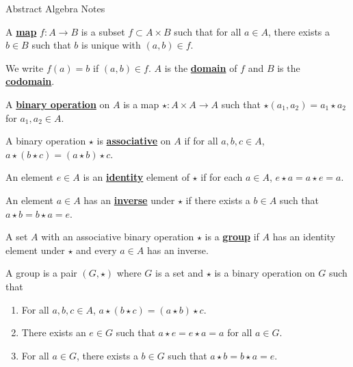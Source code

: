 \documentclass[11pt,letterpaper,boxed]{hmcpset}
\newcommand{\define}[1]{\underline{\textbf{#1}}}
\theoremstyle{definition}
\begin{document}
\begin{center}
    \LARGE{Abstract Algebra Notes}
\end{center}

\begin{defi}
    A \define{map} $f:A \rightarrow B$ is a subset $f\subset A\times B$ such that for all $a\in A$, there exists a $b\in B$ such that $b$ is unique with $(a,b)\in f$.
\end{defi}

\begin{defi}
    We write $f(a)=b$ if $(a,b)\in f$. $A$ is the \define{domain} of $f$ and $B$ is the \define{codomain}.
\end{defi}

\begin{defi}
    A \define{binary operation} on $A$ is a map $\star:A\times A\rightarrow A$ such that $\star(a_1,a_2)=a_1\star a_2$ for $a_1,a_2\in A$.
\end{defi}

\begin{defi}
    A binary operation $\star$ is \define{associative} on $A$ if for all $a,b,c\in A$, $a\star(b\star c)=(a\star b)\star c$.
\end{defi}

\begin{defi}
    An element $e\in A$ is an \define{identity} element of $\star$ if for each $a\in A$, $e\star a=a\star e=a$.
\end{defi}

\begin{defi}
    An element $a\in A$ has an \define{inverse} under $\star$ if there exists a $b\in A$ such that $a\star b=b\star a=e$.
\end{defi}

\begin{defi}
    A set $A$ with an associative binary operation $\star$ is a \define{group} if $A$ has an identity element under $\star$ and every $a\in A$ has an inverse.
\end{defi}

\begin{bdefi}
    A group is a pair $(G,\star)$ where $G$ is a set and $\star$ is a binary operation on $G$ such that
    \begin{enumerate}
        \item For all $a,b,c\in A$, $a\star(b\star c)=(a\star b)\star c$.
        \item There exists an $e\in G$ such that $a\star e=e\star a=a$ for all $a\in G$.
        \item For all $a\in G$, there exists a $b\in G$ such that $a\star b=b\star a=e$.
    \end{enumerate}
\end{bdefi}
\end{document}
